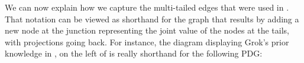 \documentclass{article}
\newcommand{\V}{\mathcal V}
\newcommand{\MN}{PDG}
\numberwithin{equation}{section}
\begin{document}
        We can now explain how we capture
        the multi-tailed edges that 
        were used in 
. 
That notation can be viewed as shorthand for the graph that results by adding a new node at the junction representing the joint value of the nodes at the tails, with projections going back.  For instance,
the diagram displaying Grok's prior knowledge in , on the left of 
is really shorthand for the following \MN:
	\begin{center}
% 
% 
% 
	\end{center}
\end{document}
